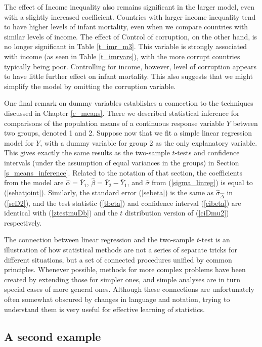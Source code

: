 The effect of Income inequality also remains significant in the larger
model, even with a slightly increased coefficient. Countries with larger
income inequality tend to have higher levels of infant mortality, even
when we compare countries with similar levels of income. The effect of
Control of corruption, on the other hand, is no longer significant in
Table \ref{t_imr_m3}. This variable is strongly associated with income
(as seen in Table \ref{t_imrvars}), with the more corrupt countries
typically being poor. Controlling for income, however, level of
corruption appears to have little further effect on infant mortality.
This also suggests that we might simplify the model by omitting the
corruption variable.

One final remark on dummy variables establishes a connection to the
techniques discussed in Chapter \ref{c_means}. There we described
statistical inference for comparisons of the population means of a
continuous response variable $Y$ between two groups, denoted 1 and 2.
Suppose now that we fit a simple linear regression model for $Y$,
with a dummy variable for group 2 as the only explanatory variable. This
gives exactly the same results as the two-sample $t$-tests and
confidence intervals (under the assumption of equal variances in the
groups) in Section \ref{s_means_inference}. Related to the notation of that
section, the coefficients from the model are $\hat{\alpha}=\bar{Y}_{1}$,
$\hat{\beta}=\bar{Y}_{2}-\bar{Y}_{1}$, and $\hat{\sigma}$ from
(\ref{sigma_linreg}) is equal to (\ref{sehatjoint}). Similarly, the
standard error (\ref{sebeta}) is the same as
$\hat{\sigma}_{\hat{\Delta}}$ in (\ref{seD2}), and the test statistic
(\ref{tbeta}) and confidence interval (\ref{cibeta}) are identical with
(\ref{ztestmuDb}) and the $t$ distribution version of (\ref{ciDmu2})
respectively.

The connection between linear regression and the two-sample $t$-test is
an illustration of how statistical methods are not a series of separate
tricks for different situations, but a set of connected procedures
unified by common principles. Whenever possible, methods for more
complex problems have been created by extending those for simpler ones,
and simple analyses are in turn special cases of more general
ones. Although these connections are unfortunately often somewhat
obscured by changes in language and notation, trying to understand them
is very useful for effective learning of statistics.

\subsection{A second example}
\label{ss_regression_dummies_example}

